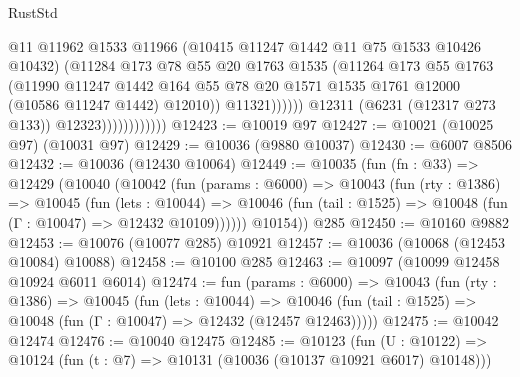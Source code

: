 \begin{lexlean}{RustStd}
\begin{coremodule}
{{                                      @11
                                      @11962
                                      @1533
                                      @11966
                                      (@10415 @11247 @1442 @11 @75 @1533 @10426 @10432)
                                      (@11284
                                        @173
                                        @78
                                        @55
                                        @20
                                        @1763
                                        @1535
                                        (@11264
                                          @173
                                          @55
                                          @1763
                                          (@11990
                                            @11247
                                            @1442
                                            @164
                                            @55
                                            @78
                                            @20
                                            @1571
                                            @1535
                                            @1761
                                            @12000
                                            (@10586 @11247 @1442)
                                            @12010))
                                        @11321))))))
                            @12311
                            (@6231 (@12317 @273 @133))
                            @12323))))))))))))
@12423 := @10019 @97
@12427 := @10021 (@10025 @97) (@10031 @97)
@12429 := @10036 (@9880 @10037)
@12430 := @6007 @8506
@12432 := @10036 (@12430 @10064)
@12449 := @10035
    (fun (fn : @33) =>
    @12429
      (@10040
        (@10042
          (fun (params : @6000) =>
          @10043
            (fun (rty : @1386) =>
            @10045
              (fun (lets : @10044) =>
              @10046 (fun (tail : @1525) => @10048 (fun (Γ : @10047) => @12432 @10109))))))
        @10154))
    @285
@12450 := @10160 @9882
@12453 := @10076 (@10077 @285) @10921
@12457 := @10036 (@10068 (@12453 @10084) @10088)
@12458 := @10100 @285
@12463 := @10097 (@10099 @12458 @10924 @6011 @6014)
@12474 := fun (params : @6000) =>
  @10043
    (fun (rty : @1386) =>
    @10045
      (fun (lets : @10044) =>
      @10046 (fun (tail : @1525) => @10048 (fun (Γ : @10047) => @12432 (@12457 @12463)))))
@12475 := @10042 @12474
@12476 := @10040 @12475
@12485 := @10123
    (fun (U : @10122) => @10124 (fun (t : @7) => @10131 (@10036 (@10137 @10921 @6017) @10148)))
}}
\end{coremodule}
\end{lexlean}
